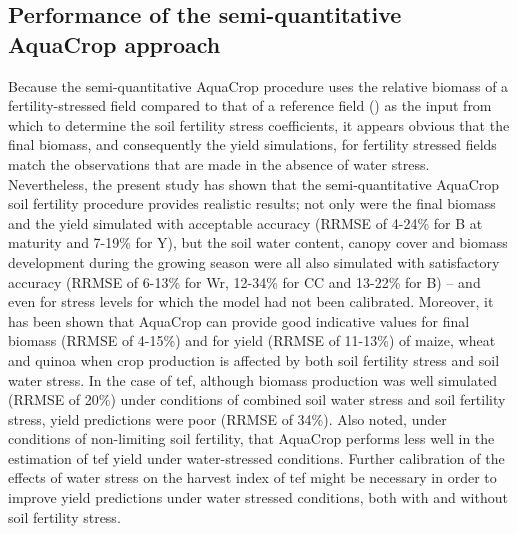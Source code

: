 \subsection{Performance of the semi-quantitative AquaCrop approach}
Because the semi-quantitative AquaCrop procedure uses the relative biomass of a fertility-stressed field compared to that of a reference field (\Brel) as the input from which to determine the soil fertility stress coefficients, it appears obvious that the final biomass, and consequently the yield simulations, for fertility stressed fields match the observations that are made in the absence of water stress. Nevertheless, the present study has shown that the semi-quantitative AquaCrop soil fertility procedure provides realistic results; not only were the final biomass and the yield simulated with acceptable accuracy (RRMSE of 4-24\% for B at maturity and 7-19\% for Y), but the soil water content, canopy cover and biomass development during the growing season were all also simulated with satisfactory accuracy (RRMSE of 6-13\% for Wr, 12-34\% for CC and 13-22\% for B) – and even for stress levels for which the model had not been calibrated. Moreover, it has been shown that AquaCrop can provide good indicative values for final biomass (RRMSE of 4-15\%) and for yield (RRMSE of 11-13\%) of maize, wheat and quinoa when crop production is affected by both soil fertility stress and soil water stress. In the case of tef, although biomass production was well simulated (RRMSE of 20\%) under conditions of combined soil water stress and soil fertility stress, yield predictions were poor (RRMSE of 34\%). Also \textcite{tsegay2012} noted, under conditions of non-limiting soil fertility, that AquaCrop performs less well in the estimation of tef yield under water-stressed conditions. Further calibration of the effects of water stress on the harvest index of tef might be necessary in order to improve yield predictions under water stressed conditions, both with and without soil fertility stress.

